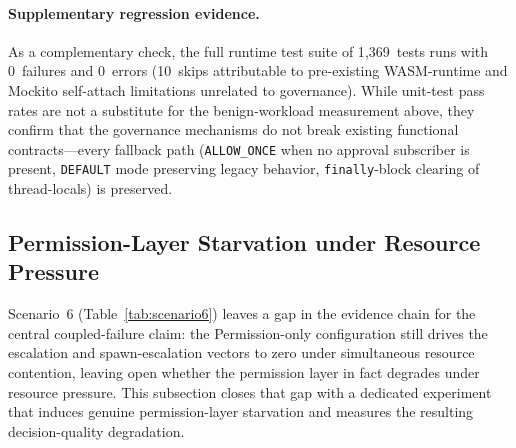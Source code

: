 \paragraph{Supplementary regression evidence.}
As a complementary check, the full runtime test suite of 1{,}369~tests runs
with 0~failures and 0~errors (10~skips attributable to pre-existing
WASM-runtime and Mockito self-attach limitations unrelated to governance).
While unit-test pass rates are not a substitute for the benign-workload
measurement above, they confirm that the governance mechanisms do not break
existing functional contracts---every fallback path
(\texttt{ALLOW\_ONCE} when no approval subscriber is present, \texttt{DEFAULT}
mode preserving legacy behavior, \texttt{finally}-block clearing of
thread-locals) is preserved.

\subsection{Permission-Layer Starvation under Resource Pressure}
\label{sec:eval-starvation}

Scenario~6 (Table~\ref{tab:scenario6}) leaves a gap in the evidence
chain for the central coupled-failure claim: the Permission-only
configuration still drives the escalation and spawn-escalation vectors
to zero under simultaneous resource contention, leaving open whether
the permission layer in fact degrades under resource pressure. This
subsection closes that gap with a dedicated experiment that induces
genuine permission-layer starvation and measures the resulting
decision-quality degradation.

